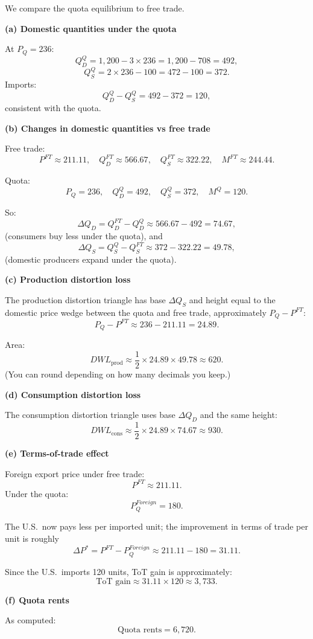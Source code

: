 \documentclass[12pt]{article}
\begin{document}
We compare the quota equilibrium to free trade.

\textbf{(a) Domestic quantities under the quota}

At $P_Q = 236$:
\[
Q_D^Q = 1{,}200 - 3\times 236
= 1{,}200 - 708 = 492,
\]
\[
Q_S^Q = 2\times 236 - 100
= 472 - 100 = 372.
\]
Imports:
\[
Q_D^Q - Q_S^Q = 492 - 372 = 120,
\]
consistent with the quota.

\textbf{(b) Changes in domestic quantities vs free trade}

Free trade:
\[
P^{FT}\approx 211.11,\quad Q_D^{FT}\approx 566.67,\quad Q_S^{FT}\approx 322.22,\quad M^{FT}\approx 244.44.
\]

Quota:
\[
P_Q = 236,\quad Q_D^Q=492,\quad Q_S^Q=372,\quad M^Q=120.
\]

So:
\[
\Delta Q_D = Q_D^{FT} - Q_D^Q \approx 566.67 - 492 = 74.67,
\]
(consumers buy less under the quota), and
\[
\Delta Q_S = Q_S^Q - Q_S^{FT} \approx 372 - 322.22 = 49.78,
\]
(domestic producers expand under the quota).

\textbf{(c) Production distortion loss}

The production distortion triangle has base $\Delta Q_S$ and height equal to the domestic price wedge between the quota and free trade, approximately $P_Q - P^{FT}$:
\[
P_Q - P^{FT} \approx 236 - 211.11 = 24.89.
\]

Area:
\[
DWL_{\text{prod}} \approx \frac{1}{2} \times 24.89 \times 49.78 \approx 620. 
\]
(You can round depending on how many decimals you keep.)

\textbf{(d) Consumption distortion loss}

The consumption distortion triangle uses base $\Delta Q_D$ and the same height:
\[
DWL_{\text{cons}} \approx \frac{1}{2} \times 24.89 \times 74.67 \approx 930.
\]

\textbf{(e) Terms-of-trade effect}

Foreign export price under free trade:
\[
P^{FT} \approx 211.11.
\]
Under the quota:
\[
P^{Foreign}_Q = 180.
\]

The U.S.\ now pays less per imported unit; the improvement in terms of trade per unit is roughly
\[
\Delta P^* = P^{FT} - P^{Foreign}_Q \approx 211.11 - 180 = 31.11.
\]

Since the U.S.\ imports 120 units, ToT gain is approximately:
\[
\text{ToT gain} \approx 31.11 \times 120 \approx 3{,}733.
\]

\textbf{(f) Quota rents}

As computed:
\[
\text{Quota rents} = 6{,}720.
\]
\end{document}

